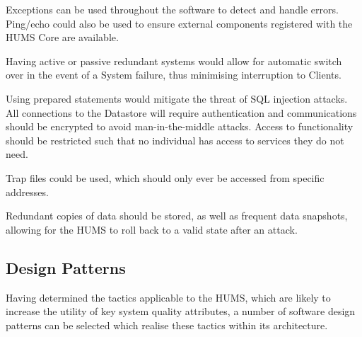 \documentclass[10pt,a4paper]{article}
\begin{document}
\begin{description}
\begin{description}[noitemsep]
	\item[Fault Detection] Exceptions can be used throughout the software to detect and handle errors. Ping/echo could also be used to ensure external components registered with the HUMS Core are available.
	\item[Fault Recovery] Having active or passive redundant systems would allow for automatic switch over in the event of a System failure, thus minimising interruption to Clients.
	\end{description}
\item[Security] \hfill
	\begin{description}[noitemsep]
	\item[Resisting Attacks] Using prepared statements would mitigate the threat of SQL injection attacks. All connections to the Datastore will require authentication and communications should be encrypted to avoid man-in-the-middle attacks. Access to functionality should be restricted such that no individual has access to services they do not need. 
	\item[Detecting Attacks] Trap files could be used, which should only ever be accessed from specific addresses.
	\item[Recovering From Attacks] Redundant copies of data should be stored, as well as frequent data snapshots, allowing for the HUMS to roll back to a valid state after an attack.
	\end{description}
\end{description}

\subsection{Design Patterns}
Having determined the tactics applicable to the HUMS, which are likely to increase the utility of key system quality attributes, a number of software design patterns can be selected which realise these tactics within its architecture.
\end{document}
